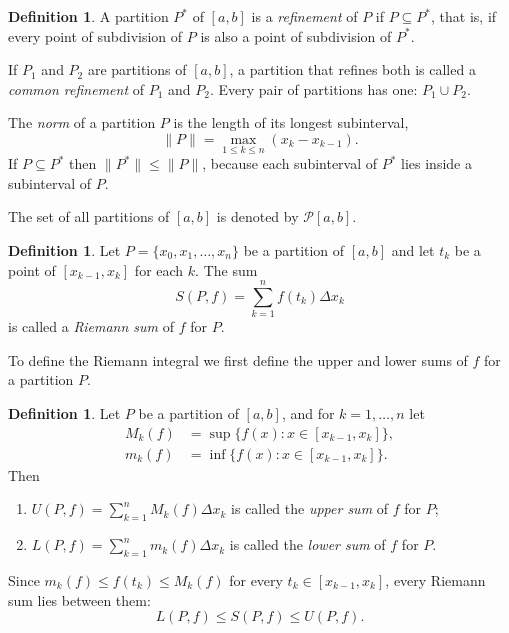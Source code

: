 \documentclass[11pt,a4paper]{article}
\numberwithin{equation}{section}
\theoremstyle{definition}
\newtheorem{defn}[thm]{Definition}
\begin{document}
\begin{defn}
A partition $P^*$ of $[a,b]$ is a \emph{refinement} of $P$ if $P\subseteq P^*$, that is, if every point of subdivision of $P$ is also a point of subdivision of $P^*$.

If $P_1$ and $P_2$ are partitions of $[a,b]$, a partition that refines both is called a \emph{common refinement} of $P_1$ and $P_2$. Every pair of partitions has one: $P_1 \cup P_2$.

The \emph{norm} of a partition $P$ is the length of its longest subinterval,
$$\|P\| =  \max_{1\leq k\leq n} (x_k - x_{k - 1}) .$$
If $P\subseteq P^*$ then $\|P^*\|\leq\|P\|$, because each subinterval of $P^*$ lies inside a subinterval of $P$.

The set of all partitions of $[a,b]$ is denoted by $\mathcal{P}[a,b]$.
\end{defn}


\begin{defn}
Let $P = \{x_0, x_1, \dots, x_n\}$ be a partition of $[a,b]$ and let $t_k$ be a point of $[x_{k - 1}, x_k]$ for each $k$. The sum
$$S(P,f) = \sum^n_{k = 1} f(t_k) \Delta x_k$$
is called a \emph{Riemann sum} of $f$ for $P$.
\end{defn}

To define the Riemann integral we first define the upper and lower sums of $f$ for a partition $P$.


\begin{defn}
Let $P$ be a partition of $[a,b]$, and for $k = 1,\dots,n$ let
\begin{align*}
M_k(f) &= \sup\{f(x): x\in [x_{k -1}, x_k]\},\\
m_k(f) &= \inf\{f(x): x\in [x_{k -1}, x_k]\}.
\end{align*}
Then
\begin{enumerate}
\item[(i)] $U(P,f) = \sum^n_{k =1}M_k(f)\Delta x_k$ is called the \emph{upper sum} of $f$ for $P$;
\item[(ii)] $L(P,f) = \sum^n_{k =1}m_k(f)\Delta x_k$ is called the \emph{lower sum} of $f$ for $P$.
\end{enumerate}
Since $m_k(f) \leq f(t_k)\leq M_k(f)$ for every $t_k \in [x_{k - 1}, x_k]$, every Riemann sum lies between them:
$$L(P,f) \leq S(P,f)\leq U(P,f).$$
\end{defn}
\end{document}
